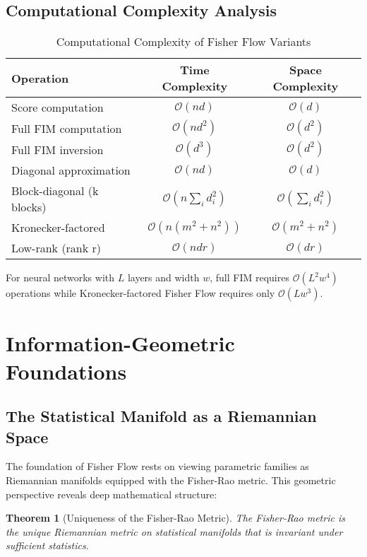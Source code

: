 \documentclass[11pt]{article}
\newtheorem{theorem}{Theorem}
\begin{document}
\subsection{Computational Complexity Analysis}

\begin{table}[h]
\centering
\caption{Computational Complexity of Fisher Flow Variants}
\begin{tabular}{lcc}
\toprule
\textbf{Operation} & \textbf{Time Complexity} & \textbf{Space Complexity} \\
\midrule
Score computation & $\mathcal{O}(nd)$ & $\mathcal{O}(d)$ \\
Full FIM computation & $\mathcal{O}(nd^2)$ & $\mathcal{O}(d^2)$ \\
Full FIM inversion & $\mathcal{O}(d^3)$ & $\mathcal{O}(d^2)$ \\
\midrule
Diagonal approximation & $\mathcal{O}(nd)$ & $\mathcal{O}(d)$ \\
Block-diagonal (k blocks) & $\mathcal{O}(n\sum_i d_i^2)$ & $\mathcal{O}(\sum_i d_i^2)$ \\
Kronecker-factored & $\mathcal{O}(n(m^2 + n^2))$ & $\mathcal{O}(m^2 + n^2)$ \\
Low-rank (rank r) & $\mathcal{O}(ndr)$ & $\mathcal{O}(dr)$ \\
\bottomrule
\end{tabular}
\end{table}

For neural networks with $L$ layers and width $w$, full FIM requires $\mathcal{O}(L^2w^4)$ operations while Kronecker-factored Fisher Flow requires only $\mathcal{O}(Lw^3)$.

\section{Information-Geometric Foundations}

\subsection{The Statistical Manifold as a Riemannian Space}

The foundation of Fisher Flow rests on viewing parametric families as Riemannian manifolds equipped with the Fisher-Rao metric. This geometric perspective reveals deep mathematical structure:

\begin{theorem}[Uniqueness of the Fisher-Rao Metric]
\label{thm:fisher_rao_unique}
The Fisher-Rao metric is the unique Riemannian metric on statistical manifolds that is invariant under sufficient statistics.
\end{theorem}
\end{document}
